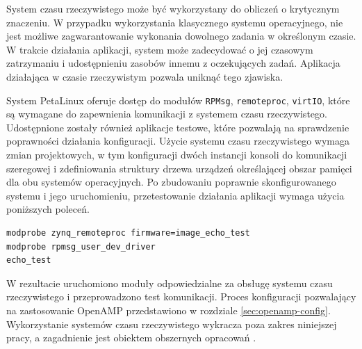 System czasu rzeczywistego może być wykorzystany do obliczeń o krytycznym znaczeniu. 
W przypadku wykorzystania klasycznego systemu operacyjnego, nie jest możliwe zagwarantowanie wykonania dowolnego zadania w określonym czasie. 
W trakcie działania aplikacji, system może zadecydować o jej czasowym zatrzymaniu i udostępnieniu zasobów innemu z oczekujących zadań. 
Aplikacja działająca w czasie rzeczywistym pozwala uniknąć tego zjawiska.

System PetaLinux oferuje dostęp do modułów \texttt{RPMsg}, \texttt{remoteproc}, \texttt{virtIO}, które są wymagane do zapewnienia komunikacji z systemem czasu rzeczywistego. 
Udostępnione zostały również aplikacje testowe, które pozwalają na sprawdzenie poprawności działania konfiguracji.
Użycie systemu czasu rzeczywistego wymaga zmian projektowych, w tym konfiguracji dwóch instancji konsoli do komunikacji szeregowej i zdefiniowania struktury drzewa urządzeń określającej obszar pamięci dla obu systemów operacyjnych. 
Po zbudowaniu poprawnie skonfigurowanego systemu i jego uruchomieniu, przetestowanie działania aplikacji wymaga użycia poniższych poleceń.

\begin{lstlisting}[breaklines=true]
modprobe zynq_remoteproc firmware=image_echo_test
modprobe rpmsg_user_dev_driver
echo_test
\end{lstlisting}

W rezultacie uruchomiono moduły odpowiedzialne za obsługę systemu czasu rzeczywistego i przeprowadzono test komunikacji. Proces konfiguracji pozwalający na zastosowanie OpenAMP przedstawiono w rozdziale \ref{sec:openamp-config}.
Wykorzystanie systemów czasu rzeczywistego wykracza poza zakres niniejszej pracy, a zagadnienie jest obiektem obszernych opracowań \cite{adam-taylor-openamp,zynq-openamp-gsg}. 


